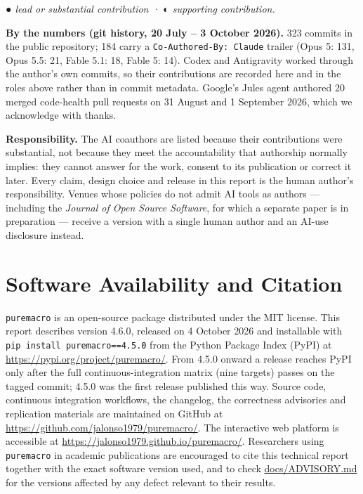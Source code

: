 \documentclass[11pt,letterpaper]{article}
\renewcommand{\_}{\pmunderscore\allowbreak}
\begin{document}
\emph{● lead or substantial contribution · ◐ supporting contribution.}

\textbf{By the numbers (git history, 20 July -- 3 October 2026).} 323 commits in the public repository; 184 carry a \texttt{Co-Authored-By:\ Claude} trailer (Opus 5: 131, Opus 5.5: 21, Fable 5.1: 18, Fable 5: 14). Codex and Antigravity worked through the author's own commits, so their contributions are recorded here and in the roles above rather than in commit metadata. Google's Jules agent authored 20 merged code-health pull requests on 31 August and 1 September 2026, which we acknowledge with thanks.

\textbf{Responsibility.} The AI coauthors are listed because their contributions were substantial, not because they meet the accountability that authorship normally implies: they cannot answer for the work, consent to its publication or correct it later. Every claim, design choice and release in this report is the human author's responsibility. Venues whose policies do not admit AI tools as authors --- including the \emph{Journal of Open Source Software}, for which a separate paper is in preparation --- receive a version with a single human author and an AI-use disclosure instead.

\section*{Software Availability and Citation}\label{software-availability-and-citation}

\texttt{puremacro} is an open-source package distributed under the MIT license. This report describes version 4.6.0, released on 4 October 2026 and installable with \texttt{pip\ install\ puremacro==4.5.0} from the Python Package Index (PyPI) at \url{https://pypi.org/project/puremacro/}. From 4.5.0 onward a release reaches PyPI only after the full continuous-integration matrix (nine targets) passes on the tagged commit; 4.5.0 was the first release published this way. Source code, continuous integration workflows, the changelog, the correctness advisories and replication materials are maintained on GitHub at \url{https://github.com/jalonso1979/puremacro/}. The interactive web platform is accessible at \url{https://jalonso1979.github.io/puremacro/}. Researchers using \texttt{puremacro} in academic publications are encouraged to cite this technical report together with the exact software version used, and to check \href{https://github.com/jalonso1979/puremacro/blob/v4.6.0/docs/ADVISORY.md}{docs/ADVISORY.md} for the versions affected by any defect relevant to their results.
\end{document}
